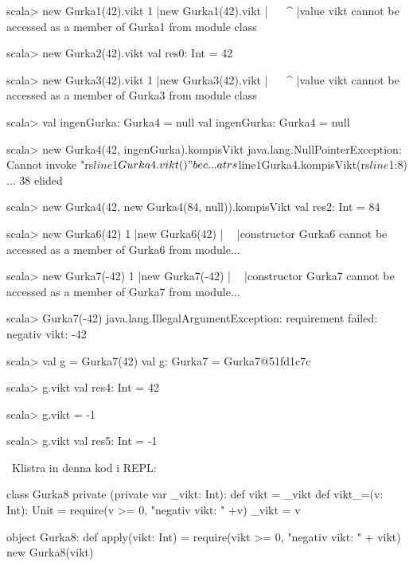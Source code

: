 \SubtaskSolved
\begin{REPL}
scala> new Gurka1(42).vikt
1 |new Gurka1(42).vikt
  |^^^^^^^^^^^^^^^^^^^
  |value vikt cannot be accessed as a member of Gurka1 from module class

scala> new Gurka2(42).vikt
val res0: Int = 42

scala> new Gurka3(42).vikt
1 |new Gurka3(42).vikt
  |^^^^^^^^^^^^^^^^^^^
  |value vikt cannot be accessed as a member of Gurka3 from module class

scala> val ingenGurka: Gurka4 = null
val ingenGurka: Gurka4 = null

scala> new Gurka4(42, ingenGurka).kompisVikt
java.lang.NullPointerException: Cannot invoke "rs$line$1$Gurka4.vikt()" bec...
  at rs$line$1$Gurka4.kompisVikt(rs$line$1:8)
  ... 38 elided

scala> new Gurka4(42, new Gurka4(84, null)).kompisVikt
val res2: Int = 84

scala> new Gurka6(42)
1 |new Gurka6(42)
  |    ^^^^^^
  |constructor Gurka6 cannot be accessed as a member of Gurka6 from module...

scala> new Gurka7(-42)
1 |new Gurka7(-42)
  |    ^^^^^^
  |constructor Gurka7 cannot be accessed as a member of Gurka7 from module...

scala> Gurka7(-42)
java.lang.IllegalArgumentException: requirement failed: negativ vikt: -42

scala> val g = Gurka7(42)
val g: Gurka7 = Gurka7@51fd1c7c

scala> g.vikt
val res4: Int = 42

scala> g.vikt = -1

scala> g.vikt
val res5: Int = -1
\end{REPL}

\QUESTEND






\QUESTBEGIN

\Task  \what~Klistra in denna kod i REPL:

\begin{Code}
class Gurka8 private (private var _vikt: Int):
    def vikt = _vikt
    def vikt_=(v: Int): Unit =
        require(v >= 0, "negativ vikt: " +v)
        _vikt = v

object Gurka8:
    def apply(vikt: Int) =
        require(vikt >= 0, "negativ vikt: " + vikt)
        new Gurka8(vikt)
\end{Code}


